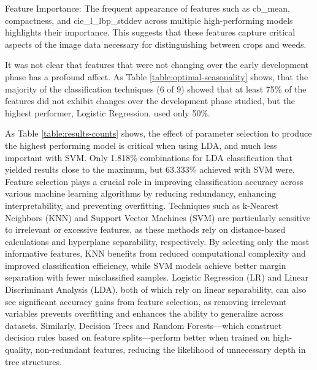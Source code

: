 \documentclass[letterpaper]{report}
\begin{document}
Feature Importance:
The frequent appearance of features such as cb\_mean, compactness, and cie\_l\_lbp\_stddev across multiple high-performing models highlights their importance. This suggests that these features capture critical aspects of the image data necessary for distinguishing between crops and weeds.

It was not clear that features that were not changing over the early development phase has a profound affect. As Table \ref{table:optimal-seasonality} shows, that the majority of the classification techniques (6 of 9) showed that at least 75\% of the features did not exhibit changes over the development phase studied, but the highest performer, Logistic Regression, used only 50\%.

As Table \ref{table:results-counts} shows, the effect of parameter selection to produce the highest performing model is critical when using LDA, and much less important with SVM. 
Only 1.818\% combinations for LDA classification that yielded results close to the maximum, but 63.333\% achieved with SVM were. 
Feature selection plays a crucial role in improving classification accuracy across various machine learning algorithms by reducing redundancy, enhancing interpretability, and preventing overfitting. Techniques such as k-Nearest Neighbors (KNN) and Support Vector Machines (SVM) are particularly sensitive to irrelevant or excessive features, as these methods rely on distance-based calculations and hyperplane separability, respectively. By selecting only the most informative features, KNN benefits from reduced computational complexity and improved classification efficiency, while SVM models achieve better margin separation with fewer misclassified samples. Logistic Regression (LR) and Linear Discriminant Analysis (LDA), both of which rely on linear separability, can also see significant accuracy gains from feature selection, as removing irrelevant variables prevents overfitting and enhances the ability to generalize across datasets. Similarly, Decision Trees and Random Forests—which construct decision rules based on feature splits—perform better when trained on high-quality, non-redundant features, reducing the likelihood of unnecessary depth in tree structures.
\end{document}
